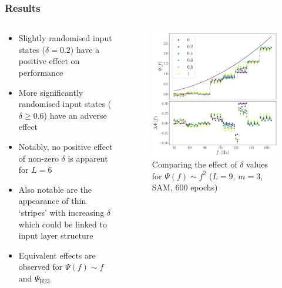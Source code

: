 \documentclass{beamer}
\begin{document}
\begin{frame}
\frametitle{Results}
\begin{columns}
\begin{column}{0.5\textwidth}
\begin{itemize}
\item Slightly randomised input states ($\delta = 0.2$)  have a \alert{positive effect} on performance
\item More significantly randomised input states ($\delta \geq 0.6$) have an \alert{adverse effect}
\item Notably, no positive effect of non-zero $\delta$ is apparent for $L=6$  
\item Also notable are the appearance of thin \alert{`stripes'} with increasing $\delta$ which could be linked to input layer structure
\item Equivalent effects are observed for $\Psi(f) \sim f $ and $\Psi_\text{H23}$
\end{itemize}
\end{column}
\begin{column}{0.5\textwidth}
\begin{figure}
\centering 
\includegraphics[width=\textwidth]{im/psi_comp_delta_L9}
\caption{Comparing the effect of $\delta$ values for $\Psi(f) \sim f^2$ ($L=9$, $m=3$, SAM, 600 epochs)}
\end{figure}
\end{column}
\end{columns}
\end{frame}
\end{document}
